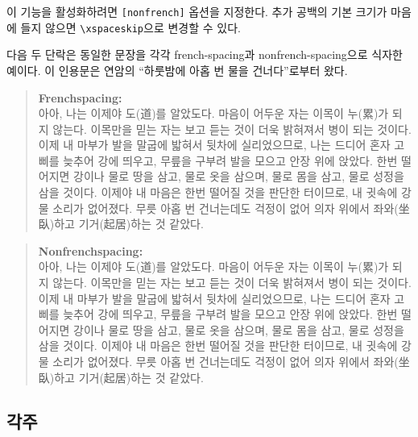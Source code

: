 이 기능을 활성화하려면 \verb|[nonfrench]| 옵션을 지정한다.
추가 공백의 기본 크기가 마음에 들지 않으면 \verb|\xspaceskip|으로 변경할 수 있다.

다음 두 단락은 동일한 문장을 각각 french-spacing{}과 nonfrench-spacing{}으로
식자한 예이다. 이 인용문은 연암의 ``하룻밤에 아홉 번 물을 건너다''\cite{yeonam}로부터 왔다.

\begin{quote}
\HangulFrenchspacing
\textbf{Frenchspacing:}\\
아아, 나는 이제야 도(道)를 알았도다. 마음이 어두운 자는 이목이
누(累)가 되지 않는다. 이목만을 믿는 자는 보고 듣는 
것이 더욱 밝혀져서 병이 되는 것이다. 이제 내 마부가 발을 말굽에 밟혀서
뒷차에 실리었으므로, 나는 드디어 혼자 고삐를 늦추어 강에 띄우고, 
무릎을 구부려 발을 모으고 안장 위에 앉았다. 한번 떨어지면 강이나
물로 땅을 삼고, 물로 옷을 삼으며, 물로 몸을 삼고, 물로 성정을 
삼을 것이다. 이제야 내 마음은 한번 떨어질 것을 판단한 터이므로,
내 귓속에 강물 소리가 없어졌다. 무릇 아홉 번 건너는데도 걱정이 없어 의자 
위에서 좌와(坐臥)하고 기거(起居)하는 것 같았다.
\end{quote}

\begin{quote}
\HangulNonfrenchspacing
\textbf{Nonfrenchspacing:}\\
아아, 나는 이제야 도(道)를 알았도다. 마음이 어두운 자는 이목이
누(累)가 되지 않는다. 이목만을 믿는 자는 보고 듣는 
것이 더욱 밝혀져서 병이 되는 것이다. 이제 내 마부가 발을 말굽에 밟혀서
뒷차에 실리었으므로, 나는 드디어 혼자 고삐를 늦추어 강에 띄우고, 
무릎을 구부려 발을 모으고 안장 위에 앉았다. 한번 떨어지면 강이나
물로 땅을 삼고, 물로 옷을 삼으며, 물로 몸을 삼고, 물로 성정을 
삼을 것이다. 이제야 내 마음은 한번 떨어질 것을 판단한 터이므로,
내 귓속에 강물 소리가 없어졌다. 무릇 아홉 번 건너는데도 걱정이 없어 의자 
위에서 좌와(坐臥)하고 기거(起居)하는 것 같았다.
\end{quote}

\subsection{각주}

